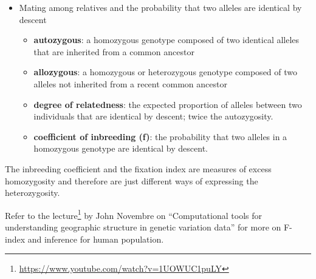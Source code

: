 \documentclass[11pt,dvipsnames,ignorenonframetext,aspectratio=169]{beamer}
\providecommand{\tightlist}{%
  \setlength{\itemsep}{0pt}\setlength{\parskip}{0pt}}
\begin{document}
\begin{frame}{}
\protect\hypertarget{section-23}{}
\begin{itemize}
\tightlist
\item
  Mating among relatives and the probability that two alleles are
  identical by descent

  \begin{itemize}
  \tightlist
  \item
    \textbf{autozygous}: a homozygous genotype composed of two identical
    alleles that are inherited from a common ancestor
  \item
    \textbf{allozygous}: a homozygous or heterozygous genotype composed
    of two alleles not inherited from a recent common ancestor
  \item
    \textbf{degree of relatedness}: the expected proportion of alleles
    between two individuals that are identical by descent; twice the
    autozygosity.
  \item
    \textbf{coefficient of inbreeding (f)}: the probability that two
    alleles in a homozygous genotype are identical by descent.
  \end{itemize}
\end{itemize}

The inbreeding coefficient and the fixation index are measures of excess
homozygosity and therefore are just different ways of expressing the
heterozygosity.

\footnotesize

Refer to the
lecture\footnote[frame]{\url{https://www.youtube.com/watch?v=1UOWUC1puLY}}
by John Novembre on ``Computational tools for understanding geographic
structure in genetic variation data'' for more on F-index and inference
for human population.
\end{frame}
\end{document}
